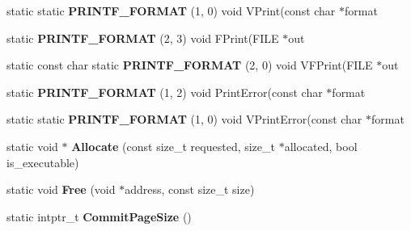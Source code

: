 \begin{DoxyCompactItemize}
\item 
static static {\bfseries P\+R\+I\+N\+T\+F\+\_\+\+F\+O\+R\+M\+AT} (1, 0) void V\+Print(const char $\ast$format\hypertarget{classv8_1_1base_1_1_o_s_a068bf3678403943a7e9450afcc57b978}{}\label{classv8_1_1base_1_1_o_s_a068bf3678403943a7e9450afcc57b978}

\item 
static {\bfseries P\+R\+I\+N\+T\+F\+\_\+\+F\+O\+R\+M\+AT} (2, 3) void F\+Print(F\+I\+LE $\ast$out\hypertarget{classv8_1_1base_1_1_o_s_a7483e74426cd21f16559d17148d837b4}{}\label{classv8_1_1base_1_1_o_s_a7483e74426cd21f16559d17148d837b4}

\item 
static const char static {\bfseries P\+R\+I\+N\+T\+F\+\_\+\+F\+O\+R\+M\+AT} (2, 0) void V\+F\+Print(F\+I\+LE $\ast$out\hypertarget{classv8_1_1base_1_1_o_s_a2a636218497d7d88c88cdad2e6cc30d5}{}\label{classv8_1_1base_1_1_o_s_a2a636218497d7d88c88cdad2e6cc30d5}

\item 
static {\bfseries P\+R\+I\+N\+T\+F\+\_\+\+F\+O\+R\+M\+AT} (1, 2) void Print\+Error(const char $\ast$format\hypertarget{classv8_1_1base_1_1_o_s_a60d63758e5e0110e020f240116e7bb6e}{}\label{classv8_1_1base_1_1_o_s_a60d63758e5e0110e020f240116e7bb6e}

\item 
static static {\bfseries P\+R\+I\+N\+T\+F\+\_\+\+F\+O\+R\+M\+AT} (1, 0) void V\+Print\+Error(const char $\ast$format\hypertarget{classv8_1_1base_1_1_o_s_aafc23e67df04850d7dd3a3cb0c660b17}{}\label{classv8_1_1base_1_1_o_s_aafc23e67df04850d7dd3a3cb0c660b17}

\item 
static void $\ast$ {\bfseries Allocate} (const size\+\_\+t requested, size\+\_\+t $\ast$allocated, bool is\+\_\+executable)\hypertarget{classv8_1_1base_1_1_o_s_a737a14deb6b5fc3af5cab07d19bafaf9}{}\label{classv8_1_1base_1_1_o_s_a737a14deb6b5fc3af5cab07d19bafaf9}

\item 
static void {\bfseries Free} (void $\ast$address, const size\+\_\+t size)\hypertarget{classv8_1_1base_1_1_o_s_ad2fb65207e5b03fe5f70bee58efc7334}{}\label{classv8_1_1base_1_1_o_s_ad2fb65207e5b03fe5f70bee58efc7334}

\item 
static intptr\+\_\+t {\bfseries Commit\+Page\+Size} ()\hypertarget{classv8_1_1base_1_1_o_s_a44bb8d89c5555fea5963ea03fc114da6}{}\label{classv8_1_1base_1_1_o_s_a44bb8d89c5555fea5963ea03fc114da6}


\end{DoxyCompactItemize}
